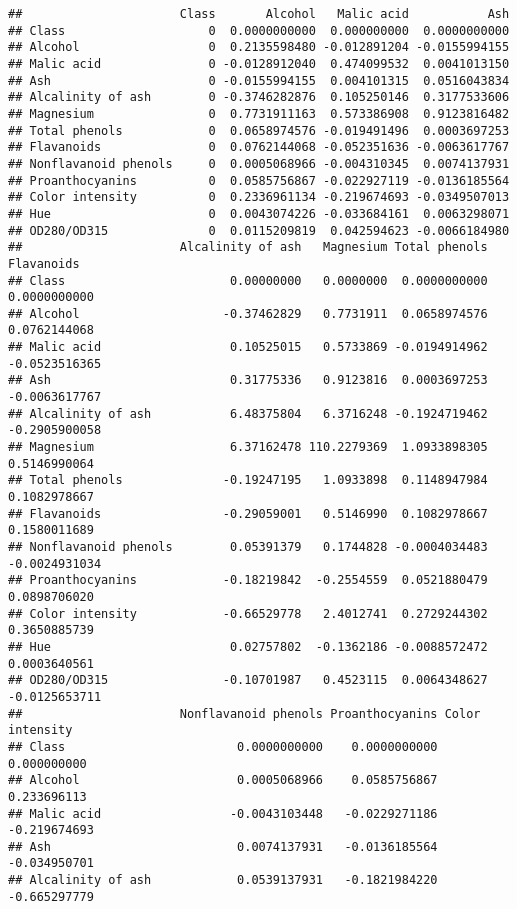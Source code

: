 \documentclass[
]{article}
\begin{document}
\begin{verbatim}
##                      Class       Alcohol   Malic acid           Ash
## Class                    0  0.0000000000  0.000000000  0.0000000000
## Alcohol                  0  0.2135598480 -0.012891204 -0.0155994155
## Malic acid               0 -0.0128912040  0.474099532  0.0041013150
## Ash                      0 -0.0155994155  0.004101315  0.0516043834
## Alcalinity of ash        0 -0.3746282876  0.105250146  0.3177533606
## Magnesium                0  0.7731911163  0.573386908  0.9123816482
## Total phenols            0  0.0658974576 -0.019491496  0.0003697253
## Flavanoids               0  0.0762144068 -0.052351636 -0.0063617767
## Nonflavanoid phenols     0  0.0005068966 -0.004310345  0.0074137931
## Proanthocyanins          0  0.0585756867 -0.022927119 -0.0136185564
## Color intensity          0  0.2336961134 -0.219674693 -0.0349507013
## Hue                      0  0.0043074226 -0.033684161  0.0063298071
## OD280/OD315              0  0.0115209819  0.042594623 -0.0066184980
##                      Alcalinity of ash   Magnesium Total phenols    Flavanoids
## Class                       0.00000000   0.0000000  0.0000000000  0.0000000000
## Alcohol                    -0.37462829   0.7731911  0.0658974576  0.0762144068
## Malic acid                  0.10525015   0.5733869 -0.0194914962 -0.0523516365
## Ash                         0.31775336   0.9123816  0.0003697253 -0.0063617767
## Alcalinity of ash           6.48375804   6.3716248 -0.1924719462 -0.2905900058
## Magnesium                   6.37162478 110.2279369  1.0933898305  0.5146990064
## Total phenols              -0.19247195   1.0933898  0.1148947984  0.1082978667
## Flavanoids                 -0.29059001   0.5146990  0.1082978667  0.1580011689
## Nonflavanoid phenols        0.05391379   0.1744828 -0.0004034483 -0.0024931034
## Proanthocyanins            -0.18219842  -0.2554559  0.0521880479  0.0898706020
## Color intensity            -0.66529778   2.4012741  0.2729244302  0.3650885739
## Hue                         0.02757802  -0.1362186 -0.0088572472  0.0003640561
## OD280/OD315                -0.10701987   0.4523115  0.0064348627 -0.0125653711
##                      Nonflavanoid phenols Proanthocyanins Color intensity
## Class                        0.0000000000    0.0000000000     0.000000000
## Alcohol                      0.0005068966    0.0585756867     0.233696113
## Malic acid                  -0.0043103448   -0.0229271186    -0.219674693
## Ash                          0.0074137931   -0.0136185564    -0.034950701
## Alcalinity of ash            0.0539137931   -0.1821984220    -0.665297779

\end{verbatim}
\end{document}
